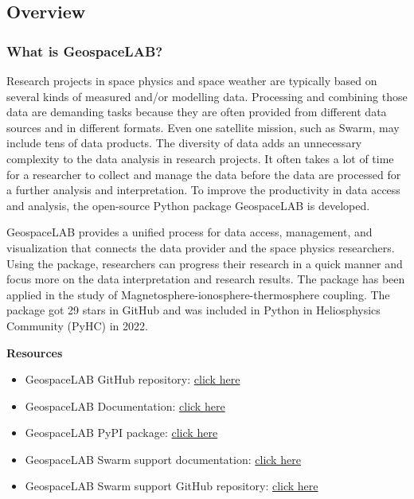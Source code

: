 \subsection{Overview}

\subsubsection{What is GeospaceLAB?}

Research projects in space physics and space weather are typically based on several kinds of measured and/or modelling data. Processing and combining those data are demanding tasks because they are often provided from different data sources and in different formats.  Even one satellite mission, such as Swarm, may include tens of data products. The diversity of data adds an unnecessary complexity to the data analysis in research projects. It often takes a lot of time for a researcher to collect and manage the data before the data are processed for a further analysis and interpretation. To improve the productivity in data access and analysis, the open-source Python package GeospaceLAB is developed.

GeospaceLAB provides a unified process for data access, management, and visualization that connects the data provider and the space physics researchers. Using the package, researchers can progress their research in a quick manner and focus more on the data interpretation and research results. The package has been applied in the study of Magnetosphere-ionosphere-thermosphere coupling. The package got 29 stars in GitHub and was included in Python in Heliosphysics Community (PyHC) in 2022.

\begin{framed}
\textbf{Resources}\\
\begin{itemize}
\item GeospaceLAB GitHub repository: \href{https://github.com/JouleCai/geospacelab}{click here}
\item GeospaceLAB Documentation: \href{https://geospacelab.readthedocs.io/en/latest/}{click here}
\item GeospaceLAB PyPI package: \href{https://pypi.org/project/geospacelab/}{click here}
\item GeospaceLAB Swarm support documentation: \href{https://geospacelab-swarm.readthedocs.io/en/latest/}{click here}
\item GeospaceLAB Swarm support GitHub repository: \href{https://github.com/JouleCai/geospacelab-swarm}{click here}
\end{itemize}
\end{framed}

